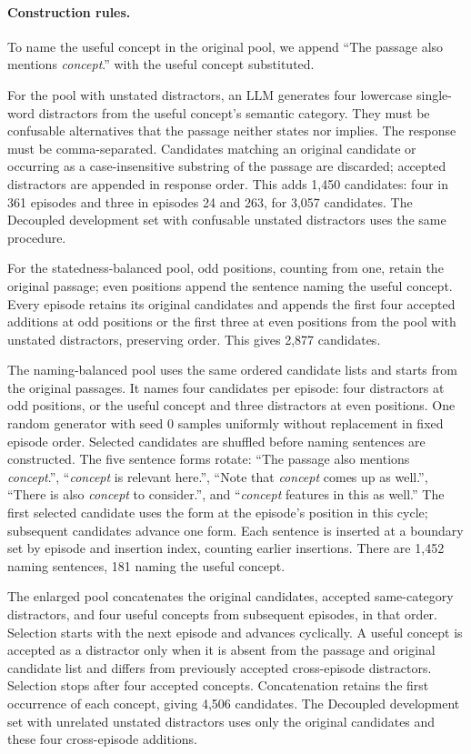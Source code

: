 \paragraph{Construction rules.}
To name the useful concept in the original pool, we append ``The passage also mentions \emph{concept}.'' with the useful concept substituted.

For the pool with unstated distractors, an LLM generates four lowercase single-word distractors from the useful concept's semantic category. They must be confusable alternatives that the passage neither states nor implies. The response must be comma-separated. Candidates matching an original candidate or occurring as a case-insensitive substring of the passage are discarded; accepted distractors are appended in response order. This adds 1,450 candidates: four in 361 episodes and three in episodes 24 and 263, for 3,057 candidates. The Decoupled development set with confusable unstated distractors uses the same procedure.

For the statedness-balanced pool, odd positions, counting from one, retain the original passage; even positions append the sentence naming the useful concept. Every episode retains its original candidates and appends the first four accepted additions at odd positions or the first three at even positions from the pool with unstated distractors, preserving order. This gives 2,877 candidates.

The naming-balanced pool uses the same ordered candidate lists and starts from the original passages. It names four candidates per episode: four distractors at odd positions, or the useful concept and three distractors at even positions. One random generator with seed 0 samples uniformly without replacement in fixed episode order. Selected candidates are shuffled before naming sentences are constructed. The five sentence forms rotate: ``The passage also mentions \emph{concept}.'', ``\emph{concept} is relevant here.'', ``Note that \emph{concept} comes up as well.'', ``There is also \emph{concept} to consider.'', and ``\emph{concept} features in this as well.'' The first selected candidate uses the form at the episode's position in this cycle; subsequent candidates advance one form. Each sentence is inserted at a boundary set by episode and insertion index, counting earlier insertions. There are 1,452 naming sentences, 181 naming the useful concept.

The enlarged pool concatenates the original candidates, accepted same-category distractors, and four useful concepts from subsequent episodes, in that order. Selection starts with the next episode and advances cyclically. A useful concept is accepted as a distractor only when it is absent from the passage and original candidate list and differs from previously accepted cross-episode distractors. Selection stops after four accepted concepts. Concatenation retains the first occurrence of each concept, giving 4,506 candidates. The Decoupled development set with unrelated unstated distractors uses only the original candidates and these four cross-episode additions.

